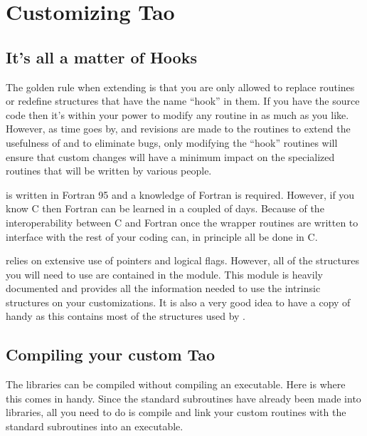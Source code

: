 \chapter{Customizing Tao}
\label{c:custom_tao}

\section{It's all a matter of Hooks}

The golden rule when extending \tao is that you are only allowed to
replace routines or redefine structures that have the name ``hook'' in
them.  If you have the source code then it's within your power to
modify any routine in \tao as much as you like. However, as time goes
by, and revisions are made to the \tao routines to extend the
usefulness of \tao and to eliminate bugs, only modifying the ``hook''
routines will ensure that custom changes will have a minimum impact on
the specialized routines that will be written by various people.

\tao is written in Fortran 95 and a knowledge of Fortran is
required. However, if you know C then Fortran can be learned in a
coupled of days. Because of the interoperability between C and Fortran
once the wrapper routines are written to interface with \tao the rest
of your coding can, in principle all be done in C.

\tao relies on extensive use of pointers and logical flags. However,
all of the structures you will need to use are contained in the
 module. This module is heavily documented and
provides all the information needed to use the intrinsic \tao
structures on your customizations. It is also a very good idea to have
a copy of  handy as this contains most of the
structures used by \bmad.

\section{Compiling your custom Tao}

The \tao libraries can be compiled without compiling an
executable. Here is where this comes in handy. Since the standard \tao
subroutines have already been made into libraries, all you need to do
is compile and link your custom routines with the standard \tao
subroutines into an executable.

